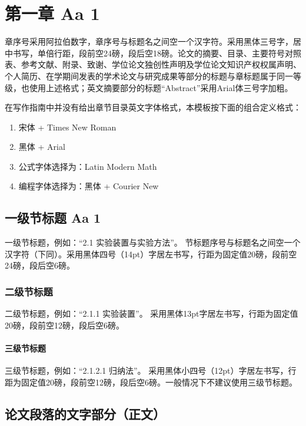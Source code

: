 \chapter{第一章 Aa 1}

章序号采用阿拉伯数字，章序号与标题名之间空一个汉字符。采用黑体三号字，居中书写，单倍行距，段前空24磅，段后空18磅。论文的摘要、目录、主要符号对照表、参考文献、附录、致谢、学位论文独创性声明及学位论文知识产权权属声明、个人简历、在学期间发表的学术论文与研究成果等部分的标题与章标题属于同一等级，也使用上述格式；英文摘要部分的标题“Abstract”采用Arial体三号字加粗。

在写作指南中并没有给出章节目录英文字体格式，本模板按下面的组合定义格式：

\begin{enumerate}
	\item 宋体 + Times New Roman
	\item 黑体 + Arial
	\item 公式字体选择为：Latin Modern Math
	\item 编程字体选择为：黑体 + Courier New
\end{enumerate}

\section{一级节标题 Aa 1}

一级节标题，例如：“2.1  实验装置与实验方法”。
节标题序号与标题名之间空一个汉字符（下同）。采用黑体四号（14pt）字居左书写，行距为固定值20磅，段前空24磅，段后空6磅。


\subsection{二级节标题}

二级节标题，例如：“2.1.1  实验装置”。
采用黑体13pt字居左书写，行距为固定值20磅，段前空12磅，段后空6磅。


\subsubsection{三级节标题}

三级节标题，例如：“2.1.2.1  归纳法”。
采用黑体小四号（12pt）字居左书写，行距为固定值20磅，段前空12磅，段后空6磅。一般情况下不建议使用三级节标题。


\section{论文段落的文字部分（正文）}

